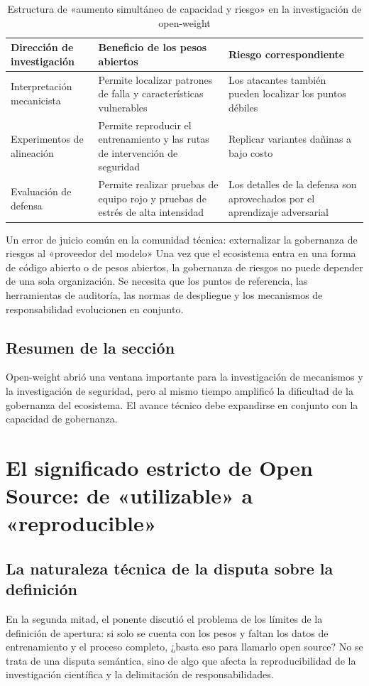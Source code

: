 \documentclass[a4paper]{article}
\begin{document}
\begin{table}[H]
\centering
\begin{tabular}{p{2.8cm}p{4.0cm}p{4.8cm}}
\toprule
\textbf{Dirección de investigación} & \textbf{Beneficio de los pesos abiertos} & \textbf{Riesgo correspondiente} \\
\midrule
Interpretación mecanicista & Permite localizar patrones de falla y características vulnerables & Los atacantes también pueden localizar los puntos débiles \\
Experimentos de alineación & Permite reproducir el entrenamiento y las rutas de intervención de seguridad & Replicar variantes dañinas a bajo costo \\
Evaluación de defensa & Permite realizar pruebas de equipo rojo y pruebas de estrés de alta intensidad & Los detalles de la defensa son aprovechados por el aprendizaje adversarial \\
\bottomrule
\end{tabular}
\caption{Estructura de «aumento simultáneo de capacidad y riesgo» en la investigación de open-weight}
\end{table}

\begin{warningbox}{Un error de juicio común en la comunidad técnica: externalizar la gobernanza de riesgos al «proveedor del modelo»}
Una vez que el ecosistema entra en una forma de código abierto o de pesos abiertos, la gobernanza de riesgos no puede depender de una sola organización.  
Se necesita que los puntos de referencia, las herramientas de auditoría, las normas de despliegue y los mecanismos de responsabilidad evolucionen en conjunto.
\end{warningbox}

\subsection{Resumen de la sección}
Open-weight abrió una ventana importante para la investigación de mecanismos y la investigación de seguridad, pero al mismo tiempo amplificó la dificultad de la gobernanza del ecosistema. El avance técnico debe expandirse en conjunto con la capacidad de gobernanza.


\section{El significado estricto de Open Source: de «utilizable» a «reproducible»}

\subsection{La naturaleza técnica de la disputa sobre la definición}
En la segunda mitad, el ponente discutió el problema de los límites de la definición de apertura: si solo se cuenta con los pesos y faltan los datos de entrenamiento y el proceso completo, ¿basta eso para llamarlo open source? No se trata de una disputa semántica, sino de algo que afecta la reproducibilidad de la investigación científica y la delimitación de responsabilidades.
\end{document}
